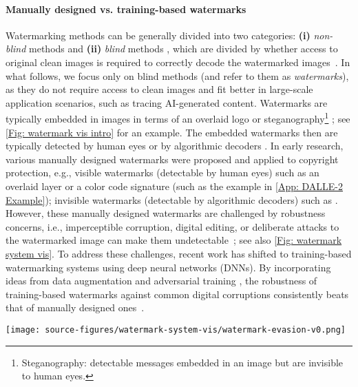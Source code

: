 \paragraph{Manually designed vs. training-based watermarks}
Watermarking methods can be generally divided into two categories: \textbf{(i)} \emph{non-blind} methods \citep{cox1997secure,hsieh2001hiding,pereira2000fast} and \textbf{(ii)} \emph{blind} methods \citep{bi2007robust}, which are divided by whether access to original clean images is required to correctly decode the watermarked images~\citep{Zhao2024SoKWF}. In what follows, we focus only on blind methods (and refer to them as \emph{watermarks}), as they do not require access to clean images and fit better in large-scale application scenarios, such as tracing AI-generated content. Watermarks are typically embedded in images in terms of an overlaid logo or steganography\footnote{Steganography: detectable messages embedded in an image but are invisible to human eyes.} \citep{morkel2005overview}; see \cref{Fig: watermark vis intro} for an example. The embedded watermarks then are typically detected by human eyes or by algorithmic decoders \citep{voyatzis1999protecting,zhu2018hidden}. In early research, various manually designed watermarks were proposed and applied to copyright protection, e.g., visible watermarks (detectable by human eyes) such as an overlaid layer \citep{kankanhalli1999adaptive} or a color code signature (such as the example in \cref{App: DALLE-2 Example}); invisible watermarks (detectable by algorithmic decoders) such as \cite{tirkel1993electronic,pereira2000robust,navas2008dwt}. However, these manually designed watermarks are challenged by robustness concerns, i.e., imperceptible corruption, digital editing, or deliberate attacks to the watermarked image can make them undetectable~\citep{remove2022remove,zhao2023invisible}; see also \cref{Fig: watermark system vis}. To address these challenges, recent work has shifted to training-based watermarking systems using deep neural networks (DNNs). By incorporating ideas from data augmentation \citep{mumuni2022data} and adversarial training \citep{goodfellow2014explaining}%
, the robustness of training-based watermarks against common digital corruptions consistently beats that of manually designed ones~\citep{zhu2018hidden,zhang2019robust,tancik2020stegastamp,jia2021mbrs}. 

\begin{figure*}[!htbp]
\centering
\texttt{[image: source-figures/watermark-system-vis/watermark-evasion-v0.png]}
\caption{Illustration of the watermarking system and the robustness concern---watermarks may be removed with little loss of image quality.}%
\vspace{-1em}
\label{Fig: watermark system vis}
\end{figure*}

